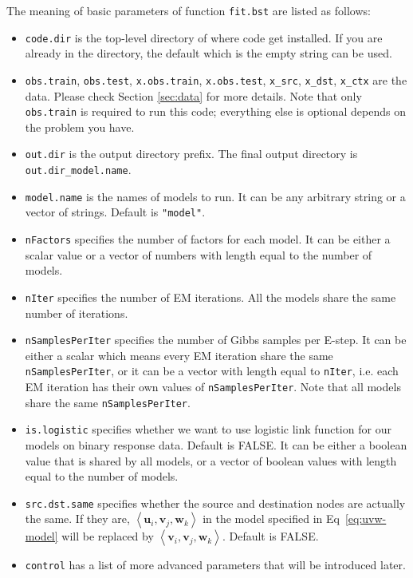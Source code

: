  The meaning of basic parameters of function {\tt fit.bst} are listed as follows:
\begin{itemize}
\item {\tt code.dir} is the top-level directory of where code get installed. If you are already in the directory, the default which is the empty string can be used.
\item {\tt obs.train}, {\tt obs.test}, {\tt x.obs.train}, 
	{\tt x.obs.test}, {\tt x\_src}, {\tt x\_dst}, {\tt x\_ctx} are the data. Please check Section \ref{sec:data} for more details. Note that only {\tt obs.train} is required to run this code; everything else is optional depends on the problem you have.
\item {\tt out.dir} is the output directory prefix. The final output directory is {\tt out.dir\_model.name}. 
\item {\tt model.name} is the names of models to run. It can be any arbitrary string or a vector of strings. Default is {\tt "model"}.
\item {\tt nFactors} specifies the number of factors for each model. It can be either a scalar value or a vector of numbers with length equal to the number of models.
\item {\tt nIter} specifies the number of EM iterations. All the models share the same number of iterations.
\item {\tt nSamplesPerIter} specifies the number of Gibbs samples per E-step. It can be either a scalar which means every EM iteration share the same {\tt nSamplesPerIter}, or it can be a vector with length equal to {\tt nIter}, i.e. each EM iteration has their own values of {\tt nSamplesPerIter}. Note that all models share the same {\tt nSamplesPerIter}.
\item {\tt is.logistic} specifies whether we want to use logistic link function for our models on binary response data. Default is FALSE. It can be either a boolean value that is shared by all models, or a vector of boolean values with length equal to the number of models.
\item {\tt src.dst.same} specifies whether the source and destination nodes are actually the same. If they are, $\left<\bm{u}_i, \bm{v}_j, \bm{w}_k\right>$ in the model specified in Eq~\ref{eq:uvw-model} will be replaced by $\left<\bm{v}_i, \bm{v}_j, \bm{w}_k\right>$. Default is FALSE.
\item {\tt control} has a list of more advanced parameters that will be introduced later.
\end{itemize}

